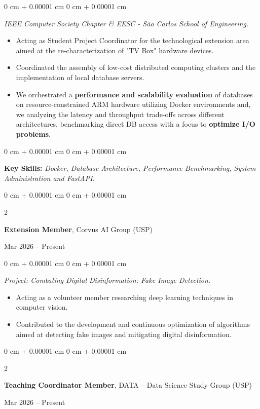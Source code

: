 \documentclass[10pt, letterpaper]{article}
\newenvironment{highlights}{
    \begin{itemize}[
        topsep=0.10 cm,
        parsep=0.10 cm,
        partopsep=0pt,
        itemsep=0pt,
        leftmargin=0 cm + 10pt
    ]
}{
    \end{itemize}
} %
\newenvironment{onecolentry}{
    \begin{adjustwidth}{
        0 cm + 0.00001 cm
    }{
        0 cm + 0.00001 cm
    }
}{
    \end{adjustwidth}
} %
\newenvironment{twocolentry}[2][]{
    \onecolentry
    \def\secondColumn{#2}
    \setcolumnwidth{\fill, 4.5 cm}
    \begin{paracol}{2}
}{
    \switchcolumn \raggedleft \secondColumn
    \end{paracol}
    \endonecolentry
} %
\begin{document}
\vspace{0.10 cm}
\begin{onecolentry}
    \textit{IEEE Computer Society Chapter \& EESC - São Carlos School of Engineering.}
    \begin{highlights}
        \item Acting as Student Project Coordinator for the technological extension area aimed at the re-characterization of "TV Box" hardware devices.
        \item Coordinated the assembly of low-cost distributed computing clusters and the implementation of local database servers.
        \item We orchestrated a \textbf{performance and scalability evaluation} of databases on resource-constrained ARM hardware utilizing Docker environments and, we analyzing the latency and throughput trade-offs across different architectures, benchmarking direct DB access with a focus to \textbf{optimize I/O problems}.
    \end{highlights}
\end{onecolentry}
\vspace{0.10 cm}
\begin{onecolentry}
    \setlength{\leftskip}{0.3cm}
    {\footnotesize \textbf{Key Skills:} \textit{Docker, Database Architecture, Performance Benchmarking, System Administration and FastAPI.}}
\end{onecolentry}

\vspace{0.20 cm}

\begin{twocolentry}{
    Mar 2026 – Present
}
    \textbf{Extension Member}, Corvus AI Group (USP)
\end{twocolentry}

\vspace{0.10 cm}
\begin{onecolentry}
    \textit{Project: Combating Digital Disinformation: Fake Image Detection.}
    \begin{highlights}
        \item Acting as a volunteer member researching deep learning techniques in computer vision.
        \item Contributed to the development and continuous optimization of algorithms aimed at detecting fake images and mitigating digital disinformation.
    \end{highlights}
\end{onecolentry}

\begin{twocolentry}{
    Mar 2026 – Present
}
    \textbf{Teaching Coordinator Member}, DATA -- Data Science Study Group (USP)
\end{twocolentry}
\end{document}
